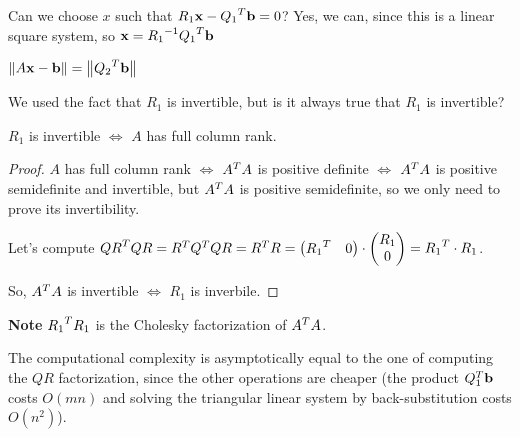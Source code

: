 \documentclass[computational_mathematics.tex]{subfiles}
\begin{document}
Can we choose $x$ such that $R_{1} \mathbf{x} - {Q_{1}}^{T} \mathbf{b} = 0$? Yes, we can, since this is a linear square system, so $\mathbf{x} = {R_{1}}^{-1} {Q_{1}}^{T} \mathbf{b} $

$\left\lVert A\mathbf{x} - \mathbf{b}\right\rVert = \left\lVert{Q_{2}}^{T} \mathbf{b}\right\rVert$


We used the fact that $R_{1}$ is invertible, but is it always true that $R_{1}$ is invertible?

\begin{lemma}
  $R_{1}$ is invertible $\Leftrightarrow$ $A$ has full column rank.
\end{lemma}

\begin{proof}
  $A$ has full column rank $\Leftrightarrow$ ${A}^{T}A$ is positive definite $\Leftrightarrow$ ${A}^{T}A$ is positive semidefinite and invertible, but ${A}^{T}A$ is positive semidefinite, so we only need to prove its invertibility.
  
  Let's compute ${QR}^{T} QR = {R}^{T} {Q}^{T} Q R = {R}^{T} R = \begin{pmatrix} {R_{1}}^{T} & 0 \end{pmatrix} \cdot \begin{pmatrix} R_{1}\\ 0 \end{pmatrix} = {R_{1}}^{T} \cdot R_1$.
    
    So, ${A}^{T}A$ is invertible $\Leftrightarrow$ $R_1$ is inverbile.
\end{proof}

\begin{myframe}{\bf Note}
${R_{1}}^{T}R_{1}$ is the Cholesky factorization of ${A}^{T}A$.
\end{myframe}

The computational complexity is asymptotically equal to the one of computing the $QR$ factorization, since the other operations are cheaper (the product $Q_1^T\mathbf{b}$ costs $O(mn)$ and solving the triangular linear system by back-substitution costs $O(n^2)$).
\end{document}

